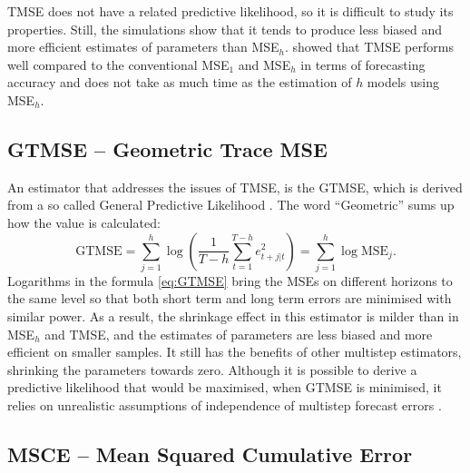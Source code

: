 \documentclass[]{book}
\theoremstyle{definition}
\theoremstyle{definition}
\theoremstyle{definition}
\theoremstyle{definition}
\theoremstyle{remark}
\begin{document}
TMSE does not have a related predictive likelihood, so it is difficult to study its properties. Still, the simulations show that it tends to produce less biased and more efficient estimates of parameters than MSE\(_h\). \citet{Kourentzes2019} showed that TMSE performs well compared to the conventional MSE\(_1\) and MSE\(_h\) in terms of forecasting accuracy and does not take as much time as the estimation of \(h\) models using MSE\(_h\).

\hypertarget{multistepLossesGTMSE}{%
\subsection{GTMSE -- Geometric Trace MSE}\label{multistepLossesGTMSE}}

An estimator that addresses the issues of TMSE, is the GTMSE, which is derived from a so called General Predictive Likelihood \citep[GPL by][]{Clements1998, Svetunkov2020Multistep}. The word ``Geometric'' sums up how the value is calculated:
\begin{equation}
    \mathrm{GTMSE} =  \sum_{j=1}^h \log \left(\frac{1}{T-h} \sum_{t=1}^{T-h} e_{t+j|t}^2 \right) = \sum_{j=1}^h \log \mathrm{MSE}_j.
  \label{eq:GTMSE}
\end{equation}
Logarithms in the formula \eqref{eq:GTMSE} bring the MSEs on different horizons to the same level so that both short term and long term errors are minimised with similar power. As a result, the shrinkage effect in this estimator is milder than in MSE\(_h\) and TMSE, and the estimates of parameters are less biased and more efficient on smaller samples. It still has the benefits of other multistep estimators, shrinking the parameters towards zero. Although it is possible to derive a predictive likelihood that would be maximised, when GTMSE is minimised, it relies on unrealistic assumptions of independence of multistep forecast errors \citep[they are always correlated as long as smoothing parameters are not zero][]{Svetunkov2020Multistep}.

\hypertarget{msce-mean-squared-cumulative-error}{%
\subsection{MSCE -- Mean Squared Cumulative Error}\label{msce-mean-squared-cumulative-error}}
\end{document}
